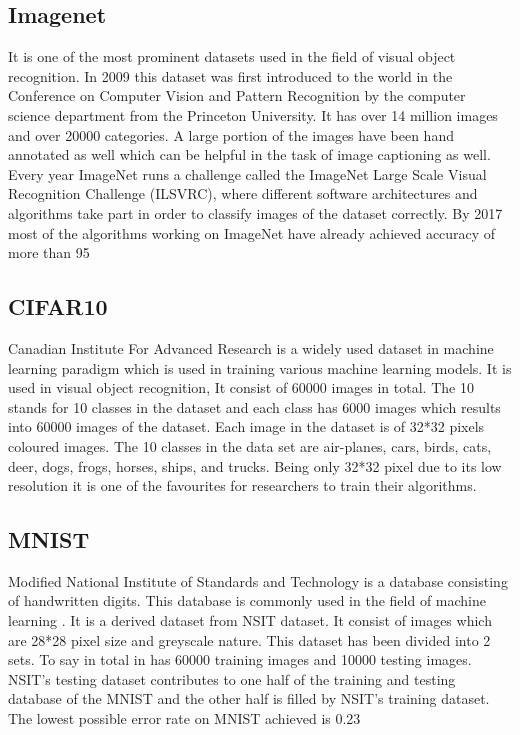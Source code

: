 \documentclass[titlepage]{report}
\begin{document}
\subsection{Imagenet}
It is one of the most prominent datasets used in the field of visual object recognition. In 2009 this dataset was first introduced to the world in the Conference on Computer Vision and Pattern Recognition by the computer science department from the Princeton University. It has over 14 million images and over 20000 categories. A large portion of the images have been hand annotated as well which can be helpful in the task of image captioning as well. Every year ImageNet runs a challenge called the ImageNet Large Scale Visual Recognition Challenge (ILSVRC), where different software architectures and algorithms take part in order to classify images of the dataset correctly. By 2017 most of the algorithms working on ImageNet have already achieved accuracy of more than 95%

\subsection{CIFAR10}
Canadian Institute For Advanced Research is a widely used dataset in machine learning paradigm which is used in training various machine learning models. It is used in visual object recognition, It consist of 60000 images in total. The 10 stands for 10 classes in the dataset and each class has 6000 images which results into 60000 images of the dataset. Each image in the dataset is of 32*32 pixels coloured images. The 10 classes in the data set are air-planes, cars, birds, cats, deer, dogs, frogs, horses, ships, and trucks. Being only 32*32 pixel due to its low resolution it is one of the favourites for researchers to train their algorithms. 

\subsection{MNIST}
Modified National Institute of Standards and Technology is a database consisting of handwritten digits. This database is commonly used in the field of machine learning . It is a derived dataset from NSIT dataset. It consist of images which are 28*28 pixel size and greyscale nature. This dataset has been divided into 2 sets. To say in total in has 60000 training images and 10000 testing images. NSIT’s testing dataset contributes to one half of the training and testing database of the MNIST and the other half is filled by NSIT’s training dataset. The lowest possible error rate on MNIST achieved is 0.23%
\end{document}
